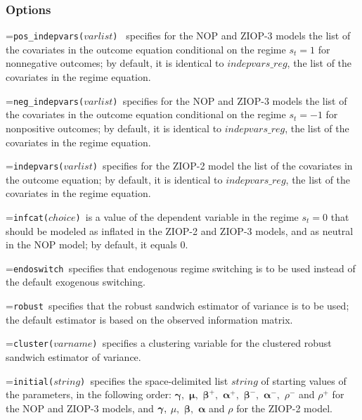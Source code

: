 \documentclass[letterpaper,fleqn,12pt]{article}
\begin{document}
\subsubsection*{Options}

\hangindent=\parindent\noindent \texttt{\texttt{pos}\_indepvars($varlist$) }%
specifies for the NOP and ZIOP-3 models the list of the covariates in the
outcome equation conditional on the regime $s_{t}=1$ for nonnegative
outcomes; by default, it is identical to \texttt{$indepvars\_reg$}, the list
of the covariates in the regime equation.

\smallskip

\hangindent=\parindent\noindent \texttt{neg\_indepvars($varlist$) }specifies
for the NOP and ZIOP-3 models the list of the covariates in the outcome
equation conditional on the regime $s_{t}=-1$ for nonpositive outcomes; by
default, it is identical to \texttt{$indepvars\_reg$}, the list of the
covariates in the regime equation.

\smallskip

\hangindent=\parindent\noindent \texttt{indepvars($varlist$) }specifies for
the ZIOP-2 model the list of the covariates in the outcome equation; by
default, it is identical to \texttt{$indepvars\_reg$}, the list of the
covariates in the regime equation.

\smallskip

\hangindent=\parindent\noindent \texttt{infcat($choice$) }is a value of the
dependent variable in the regime $s_{t}=0$ that should be modeled as
inflated in the ZIOP-2 and ZIOP-3 models, and as neutral in the NOP model;
by default, it equals 0.

\smallskip

\hangindent=\parindent\noindent \texttt{endoswitch }specifies that
endogenous regime switching is to be used instead of the default exogenous
switching.

\smallskip

\hangindent=\parindent\noindent \texttt{robust }specifies that the robust
sandwich estimator of variance is to be used; the default estimator is based
on the observed information matrix.

\smallskip

\hangindent=\parindent\noindent \texttt{cluster($varname$) }specifies a
clustering variable for the clustered robust sandwich estimator of variance.

\smallskip

\hangindent=\parindent\noindent \texttt{initial($string$) }specifies the
space-delimited list \texttt{$string$} of starting values of the parameters,
in the following order: $\mathbf{\gamma ,}$ $\mathbf{\mu ,}$ $\mathbf{\beta }%
^{+},$ $\mathbf{\alpha }^{+},$ $\mathbf{\beta }^{-},$ $\mathbf{\alpha }^{-},$
$\rho ^{-}$ and $\rho ^{+}$ for the NOP and ZIOP-3 models, and $\mathbf{%
\gamma },$ $\mu ,$ $\mathbf{\beta },$ $\mathbf{\alpha }$ and $\rho $ for the
ZIOP-2 model.
\end{document}

